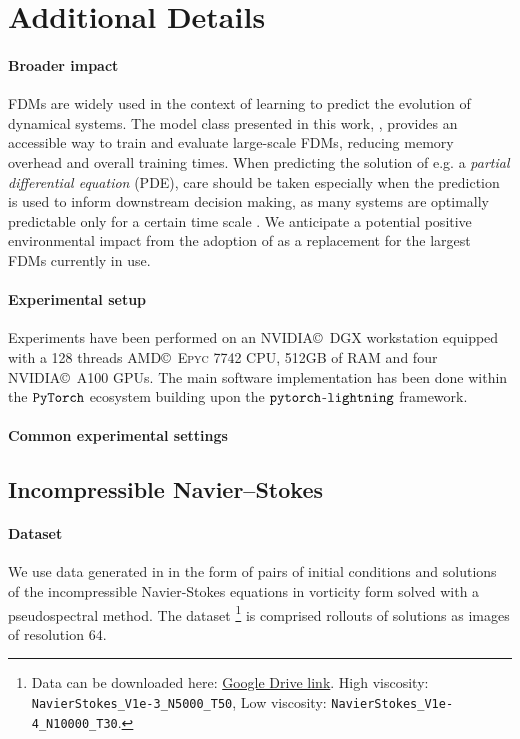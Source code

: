 
\section{Additional Details}
%
\paragraph{Broader impact}
%
FDMs are widely used in the context of learning to predict the evolution of dynamical systems. The model class presented in this work, \ourmethod{}, provides an accessible way to train and evaluate large-scale FDMs, reducing memory overhead and overall training times. When predicting the solution of e.g. a \textit{partial differential equation} (PDE), care should be taken especially when the prediction is used to inform downstream decision making, as many systems are optimally predictable only for a certain time scale \citep[pp. 366]{strogatz2018nonlinear}. We anticipate a potential positive environmental impact from the adoption of \ourmethod{} as a replacement for the largest FDMs currently in use. 
%

\paragraph{Experimental setup} Experiments have been performed on an \textsc{NVIDIA\copyright~DGX} workstation equipped with a 128 threads \textsc{AMD\copyright~Epyc 7742} CPU, 512GB of RAM and four \textsc{NVIDIA\copyright~A100} GPUs. The main software implementation has been done within the $\tt PyTorch$ \citep{paszke2017automatic} ecosystem building upon the $\tt pytorch$-$\tt lightning$ \citep{falcon2019pytorch} framework. 
%

\paragraph{Common experimental settings} 
%
\subsection{Incompressible Navier–Stokes}\label{asec:exp_nvs}
%
\paragraph{Dataset}
%
We use data generated in \citep{li2020fourier} in the form of pairs of initial conditions and solutions of the incompressible Navier-Stokes equations in vorticity form solved with a pseudospectral method. The dataset \footnote{Data can be downloaded here: \href{https://drive.google.com/drive/folders/1UnbQh2WWc6knEHbLn-ZaXrKUZhp7pjt-}{Google Drive link}. High viscosity: {\tt NavierStokes\_V1e-3\_N5000\_T50}, Low viscosity: {\tt NavierStokes\_V1e-4\_N10000\_T30}.} is comprised rollouts of solutions as images of resolution $64$.

